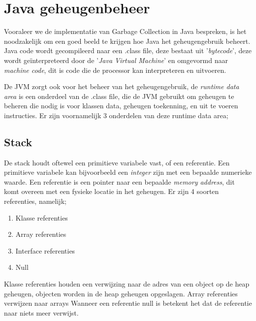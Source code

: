     
\section{Java geheugenbeheer}
\label{sec:java geheugenbeheer}
Vooraleer we de implementatie van Garbage Collection in Java bespreken, is het noodzakelijk om een goed beeld te krijgen hoe Java het geheugengebruik beheert.
Java code wordt gecompileerd naar een .class file, deze bestaat uit '\textit{bytecode}', deze wordt geïnterpreteerd door de '\textit{Java Virtual Machine}' en omgevormd naar \textit{machine code}, dit is code die de processor kan interpreteren en uitvoeren.

De JVM zorgt ook voor het beheer van het geheugengebruik, de \textit{runtime data area} is een onderdeel van de .class file, die de JVM gebruikt om geheugen te beheren die nodig is voor klassen data, geheugen toekenning, en uit te voeren instructies.\autocite{Putten2022}
Er zijn voornamelijk 3 onderdelen van deze runtime data area;

    \subsection{Stack}
    \label{sec:Stack}
    
    De stack houdt oftewel een primitieve variabele vast, of een referentie.
    Een primitieve variabele kan bijvoorbeeld een \textit{integer} zijn met een bepaalde numerieke waarde.
    Een referentie is een pointer naar een bepaalde \textit{memory address}, dit komt overeen met een fysieke locatie in het geheugen.\autocite{Huck1993}
    Er zijn 4 soorten referenties, namelijk;
    \begin{enumerate}
        \item Klasse referenties
        \item Array referenties
        \item Interface referenties
        \item Null
    \end{enumerate}
    Klasse referenties houden een verwijzing naar de adres van een object op de heap geheugen, objecten worden in de heap geheugen opgeslagen.
    Array referenties verwijzen naar arrays
    Wanneer een referentie null is betekent het dat de referentie naar niets meer verwijst.
    
